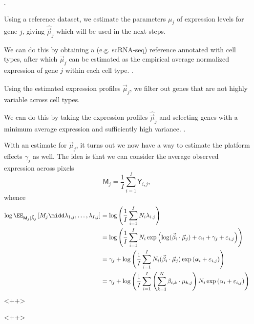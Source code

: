 \begin{enumerate}
    \ii 
    .
    
    Using a reference dataset, we estimate the parameters $\mu_j$ of expression levels for gene $j$, giving $\hat{\vec{\mu}}_j$ which will be used in the next steps.

    We can do this by obtaining a (e.g. scRNA-seq) reference annotated with cell types, after which $\vec{\mu}_j$ can be estimated as the empirical average normalized expression of gene $j$ within each cell type.
    \ii
    .

    Using the estimated expression profiles $\hat{\vec{\mu}}_j$, we filter out genes that are not highly variable across cell types.

    We can do this by taking the expression profiles $\hat{\vec{\mu}}_j$ and selecting genes with a minimum average expression and sufficiently high variance.
    \ii
    .

    With an estimate for $\vec{\mu}_j$, it turns out we now have a way to estimate the platform effects $\gamma_j$ as well.
    The idea is that we can consider the average observed expression across pixels
    \[
    \mathsf{M}_j = \frac{1}{I} \sum\limits_{i=1}^{I} \mathsf{Y}_{i, j},
    \]
    whence
    \begin{align*}
        \log \EE_{\mathsf{M}_j | \vec{\lambda}_j}\left[ M_j \midd  \lambda_{1, j}, \ldots, \lambda_{I, j} \right]
        &= \log \left( \frac{1}{I} \sum\limits_{i=1}^{I} N_i \lambda_{i, j} \right)\\
        &= \log \left( \frac{1}{I} \sum\limits_{i=1}^{I} N_i \exp \left( \log (\vec{\beta}_i \cdot \vec{\mu}_j) +\alpha_i + \gamma_j + \varepsilon_{i, j} \right) \right)\\
        &= \gamma_j + \log \left( \frac{1}{I} \sum\limits_{i=1}^{I} N_i (\vec{\beta}_i \cdot \vec{\mu}_j)\exp \left( \alpha_i + \varepsilon_{i, j} \right) \right)\\
        &= \gamma_j + \log \left( \frac{1}{I} \sum\limits_{i=1}^{I} \left( \sum\limits_{k=1}^{K} \beta_{i, k}\cdot \mu_{k, j} \right)N_i \exp \left( \alpha_i + \varepsilon_{i, j} \right) \right)\\
    \end{align*}<++>
\end{enumerate}<++>
